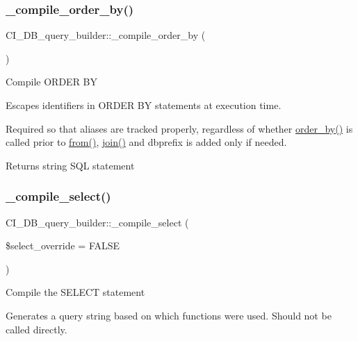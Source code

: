 \subsubsection{\texorpdfstring{\+\_\+compile\+\_\+order\+\_\+by()}{\_compile\_order\_by()}}
{\footnotesize\ttfamily C\+I\+\_\+\+D\+B\+\_\+query\+\_\+builder\+::\+\_\+compile\+\_\+order\+\_\+by (\begin{DoxyParamCaption}{ }\end{DoxyParamCaption})\hspace{0.3cm}{\ttfamily [protected]}}

Compile O\+R\+D\+ER BY

Escapes identifiers in O\+R\+D\+ER BY statements at execution time.

Required so that aliases are tracked properly, regardless of whether \mbox{\hyperlink{class_c_i___d_b__query__builder_a962f40c8b808afaaf118f4eb4c8b3d2b}{order\+\_\+by()}} is called prior to \mbox{\hyperlink{class_c_i___d_b__query__builder_a69d7cedff660dbe0dedbef5562eacefb}{from()}}, \mbox{\hyperlink{class_c_i___d_b__query__builder_a9724fb9cda09e5318fd43fff95df455a}{join()}} and dbprefix is added only if needed.

\begin{DoxyReturn}{Returns}
string S\+QL statement 
\end{DoxyReturn}
\mbox{\label{class_c_i___d_b__query__builder_a006319db39d1e7547e5a90a2e67ac9f0}} 
\subsubsection{\texorpdfstring{\+\_\+compile\+\_\+select()}{\_compile\_select()}}
{\footnotesize\ttfamily C\+I\+\_\+\+D\+B\+\_\+query\+\_\+builder\+::\+\_\+compile\+\_\+select (\begin{DoxyParamCaption}\item[{}]{\$select\+\_\+override = {\ttfamily FALSE} }\end{DoxyParamCaption})\hspace{0.3cm}{\ttfamily [protected]}}

Compile the S\+E\+L\+E\+CT statement

Generates a query string based on which functions were used. Should not be called directly.


